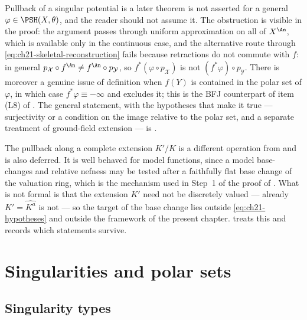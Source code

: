 \begin{warning}{Pullback of a singular potential is a later theorem}
 is not asserted for a general
\(\varphi\in\PSH(X,\theta)\), and the reader should not assume it.  The
obstruction is visible in the proof: the argument passes through uniform
approximation on all of \(X^{\An}\), which is available only in the
continuous case, and the alternative route through
\eqref{eq:ch21-skeletal-reconstruction} fails because retractions do not
commute with \(f\): in general
\(p_{\mathcal X}\circ f^{\An}\neq f^{\An}\circ p_{\mathcal Y}\), so
\(f^*(\varphi\circ p_{\mathcal X})\) is not \((f^*\varphi)\circ
p_{\mathcal Y}\).  There is moreover a genuine issue of definition when
\(f(Y)\) is contained in the polar set of \(\varphi\), in which case
\(f^*\varphi\equiv-\infty\) and  excludes it; this is
the BFJ counterpart of item (L8) of .  The
general statement, with the hypotheses that make it true --- surjectivity or
a condition on the image relative to the polar set, and a separate treatment
of ground-field extension --- is
.
\end{warning}

\begin{remark}
\label{rem:ch21-base-change}
The pullback along a complete extension \(K'/K\) is a different operation
from  and is also deferred.  It is well behaved for
model functions, since a model base-changes and relative nefness may be
tested after a faithfully flat base change of the valuation ring, which is
the mechanism used in Step~1 of the proof of
.  What is not formal is that the
extension \(K'\) need not be discretely valued --- already
\(K'=\widehat{K^a}\) is not --- so the target of the base change lies
outside \eqref{eq:ch21-hypotheses} and outside the framework of the present
chapter.   treats this and records which
statements survive.
\end{remark}

\section{Singularities and polar sets}
\label{sec:ch21-singularities}

\subsection{Singularity types}
\label{sec:ch21-singularity-types}

